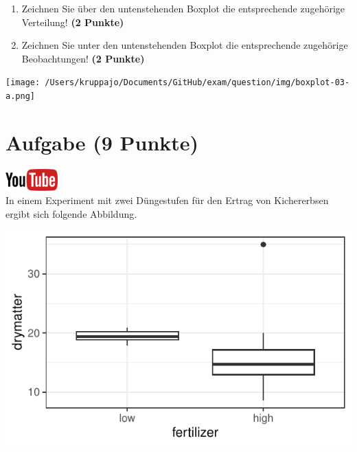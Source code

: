 \documentclass[a4paper, 10pt]{scrartcl}\usepackage[]{graphicx}\usepackage[]{xcolor}
\makeatletter
\def\maxwidth{ %
  \ifdim\Gin@nat@width>\linewidth
    \linewidth
  \else
    \Gin@nat@width
  \fi
}
\makeatother
\begin{document}
\begin{enumerate}
\item Zeichnen Sie {\"u}ber den untenstehenden Boxplot die entsprechende
  zugeh{\"o}rige Verteilung! \textbf{(2 Punkte)} 
\item Zeichnen Sie unter den untenstehenden Boxplot die entsprechende
  zugeh{\"o}rige Beobachtungen! \textbf{(2 Punkte)}
\end{enumerate}

\vspace*{8cm}

\begin{center}
  \texttt{[image: /Users/kruppajo/Documents/GitHub/exam/question/img/boxplot-03-a.png]}
\end{center}



 
\clearpage

\section{Aufgabe \hfill (9 Punkte)}

\hfill\href{https://youtu.be/lXI_H6m26HE}{\includegraphics[width =
  2cm]{img/youtube}}\\[1Ex]


In einem Experiment mit zwei D{\"u}ngestufen f{\"u}r den Ertrag von Kichererbsen
ergibt sich folgende Abbildung. 





{\centering \includegraphics[width=\maxwidth]{img/boxplot-4b-1} 

}
\end{document}
